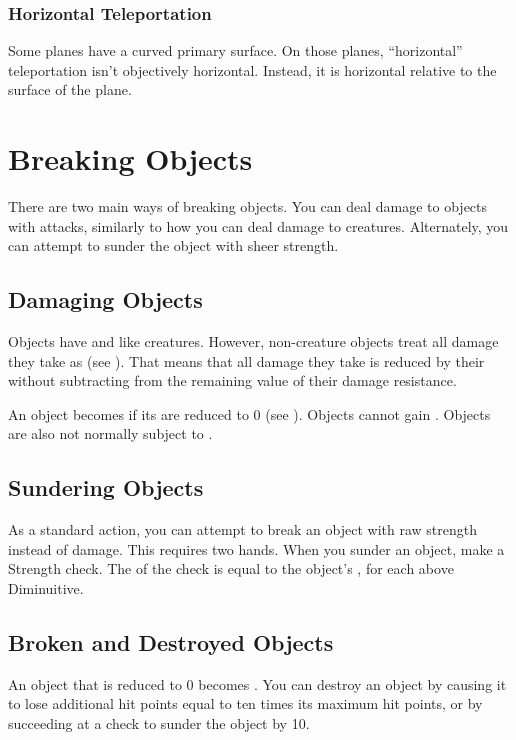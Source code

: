         \subsubsection{Horizontal Teleportation}
            Some planes have a curved primary surface.
            On those planes, ``horizontal'' teleportation isn't objectively horizontal.
            Instead, it is horizontal relative to the surface of the plane.

\section{Breaking Objects}
    There are two main ways of breaking objects.
    You can deal damage to objects with attacks, similarly to how you can deal damage to creatures.
    Alternately, you can attempt to sunder the object with sheer strength.

    \subsection{Damaging Objects}
        Objects have  and  like creatures.
        However, non-creature objects treat all damage they take as  (see ).
        That means that all damage they take is reduced by their  without subtracting from the remaining value of their damage resistance.

        An object becomes  if its  are reduced to 0 (see ).
        Objects cannot gain .
        Objects are also not normally subject to .

    \subsection{Sundering Objects}
        As a standard action, you can attempt to break an object with raw strength instead of damage.
        This requires two hands.
        When you sunder an object, make a Strength check.
        The  of the check is equal to the object's ,  for each  above Diminuitive.

    \subsection{Broken and Destroyed Objects}\label{Broken and Destroyed Objects}
        An object that is reduced to 0  becomes .
        You can destroy an object by causing it to lose additional hit points equal to ten times its maximum hit points, or by succeeding at a check to sunder the object by 10.

